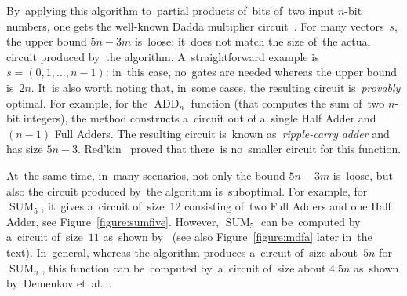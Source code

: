 \documentclass[a4paper, UKenglish, cleveref, autoref,  thm-restate, anonymous]{lipics-v2021}
\DeclareMathOperator{\SUM}{SUM}
\DeclareMathOperator{\ADD}{ADD}
\begin{document}
    By~applying this algorithm to~partial products of~bits of~two input $n$-bit numbers, one gets the well-known Dadda multiplier circuit~\cite{dadda}.
    For many vectors~$s$, the upper bound
    $5n-3m$ is~loose:
    it~does not match the size of~the actual circuit
    produced by~the algorithm.
    A~straightforward example is $s=(0,1,\dotsc,n-1)$:
    in~this case, no~gates are needed whereas the upper bound is~$2n$.
    It~is also worth noting that, in~some cases, the resulting circuit
    is~\emph{provably} optimal.
    For example, for the $\ADD_n$ function (that computes the sum of~two $n$-bit integers),
    the method constructs a~circuit out of a~single Half Adder and $(n-1)$
    Full Adders. The resulting circuit is~known as~\emph{ripple-carry adder} and has size $5n-3$.
    Red'kin~\cite{Red81} proved that there~is no~smaller circuit
    for this function.

    At~the same time, in~many scenarios,
    not only the bound $5n-3m$ is~loose,
    but also the circuit produced by~the algorithm
    is~suboptimal.
    For example, for $\SUM_5$, it~gives a~circuit of~size~$12$ consisting
    of~two Full Adders and one Half Adder, see Figure~\ref{figure:sumfive}.
    However, $\SUM_5$
    can be~computed by a~circuit of~size~$11$ as~shown by~\cite{DBLP:conf/mfcs/KulikovPS22} (see also Figure~\ref{figure:mdfa} later in~the text).
    In~general, whereas the algorithm produces a~circuit of~size about~$5n$
    for $\SUM_n$, this function can be~computed by~a~circuit of~size about $4.5n$
    as~shown by~Demenkov et~al.~\cite{DBLP:journals/ipl/DemenkovKKY10}.
\end{document}
